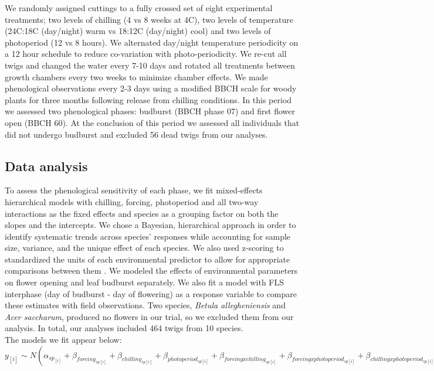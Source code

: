 \documentclass[11pt]{article}\usepackage[]{graphicx}\usepackage[]{color}
\begin{document}
\noindent We randomly assigned cuttings to a fully crossed set of eight experimental treatments; two levels of chilling (4 vs 8 weeks at 4\degree C), two levels of temperature (24\degree C:18\degree C (day/night) warm vs 18\degree:12\degree C (day/night) cool) and two levels of photoperiod (12 vs 8 hours). We alternated day/night temperature periodicity on a 12 hour schedule to reduce co-variation with photo-periodicity. We re-cut all twigs and changed the water every 7-10 days and rotated all treatments between growth chambers every two weeks to minimize chamber effects. We made phenological observations every 2-3 days using a modified BBCH scale for woody plants \citep{Finn2007} for three months following release from chilling conditions. In this period we assessed two phenological phases: budburst (BBCH phase 07) %
and first flower open (BBCH 60). At the conclusion of this period we assessed all individuals that did not undergo budburst and excluded 56 dead twigs from our analyses. 

\subsection*{Data analysis}
\noindent To assess the phenological sensitivity of each phase, we fit mixed-effects hierarchical models with chilling, forcing, photoperiod and all two-way interactions as the fixed effects and species as a grouping factor on both the slopes and the intercepts. We chose a Bayesian, hierarchical approach in order to identify systematic trends across species' responses while accounting for sample size, variance, and the unique effect of each species. We also used z-scoring to standardized the units of each environmental predictor to allow for appropriate comparisons between them \citep{Gelman2007}. We modeled the effects of environmental parameters on flower opening and leaf budburst separately. We also fit a model with FLS interphase (day of budburst - day of flowering) as a response variable to compare these estimates with field observations. Two species, \textit{Betula allegheniensis} and \textit{Acer saccharum}, produced no flowers in our trial, so we excluded them from our analysis. In total, our analyses included 464 twigs from 10 species. \\ 

The models we fit appear below:\\

$y_{[i]} \sim N(\alpha_{sp_{[i]}}+\beta_{forcing_{sp[i]}}+\beta_{chilling_{sp[i]}}+\beta_{photoperiod_{sp[i]}}+\beta_{forcing x chilling_{sp[i]}}+\beta_{forcing x photoperiod_{sp[i]}}+\beta_{chilling x photoperiod_{sp[i]}}, \sigma_y^2)$\\
\end{document}
